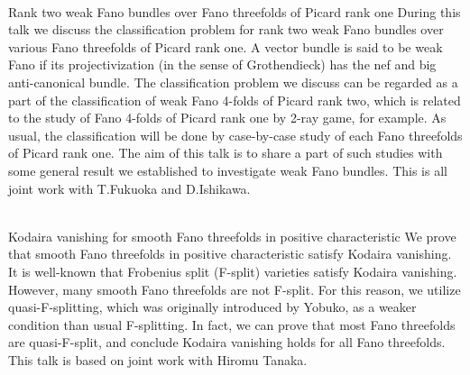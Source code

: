 \documentclass[dvipdfmx,a4paper,12pt]{article}
\theoremstyle{plain} %
\theoremstyle{definition} %
\begin{document}
\vskip3mm

\\
Rank two weak Fano bundles over Fano threefolds of Picard rank one
\vskip3mm
During this talk we discuss the classification problem for rank two weak Fano bundles over various Fano threefolds of Picard rank one.
A vector bundle is said to be weak Fano if its projectivization (in the sense of Grothendieck) has the nef and big anti-canonical bundle.
The classification problem we discuss can be regarded as a part of the classification of weak Fano 4-folds of Picard rank two,
which is related to the study of Fano 4-folds of Picard rank one by 2-ray game, for example.
As usual, the classification will be done by case-by-case study of each Fano threefolds of Picard rank one.
The aim of this talk is to share a part of such studies with some general result we established to investigate weak Fano bundles.
This is all joint work with T.Fukuoka and D.Ishikawa.
\vskip6mm

\\
Kodaira vanishing for smooth Fano threefolds in positive characteristic
\vskip3mm
We prove that smooth Fano threefolds in positive characteristic satisfy Kodaira vanishing. It is well-known that Frobenius split (F-split) varieties satisfy Kodaira vanishing. However, many smooth Fano threefolds are not F-split. For this reason, we utilize quasi-F-splitting, which was originally introduced by Yobuko, as a weaker condition than usual F-splitting. In fact, we can prove that most Fano threefolds are quasi-F-split, and conclude Kodaira vanishing holds for all Fano threefolds. 
This talk is based on joint work with Hiromu Tanaka.
\vskip6mm
\end{document}
